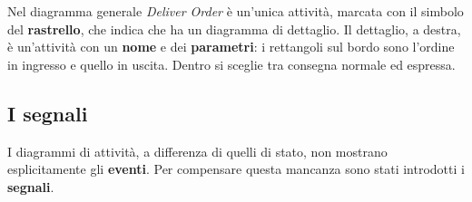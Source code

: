 Nel diagramma generale \textit{Deliver Order} è un'unica attività, marcata con il simbolo del \textbf{rastrello}, che indica che ha
un diagramma di dettaglio. Il dettaglio, a destra, è un'attività con un \textbf{nome} e dei \textbf{parametri}: i rettangoli sul
bordo sono l'ordine in ingresso e quello in uscita. Dentro si sceglie tra consegna normale ed espressa.

\subsection{I segnali}

I diagrammi di attività, a differenza di quelli di stato, non mostrano esplicitamente gli \textbf{eventi}. Per compensare questa
mancanza sono stati introdotti i \textbf{segnali}.


